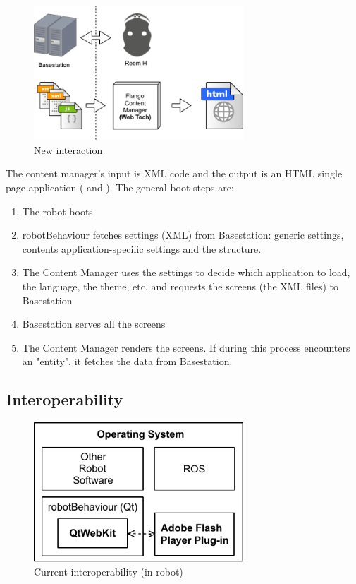 \begin{figure}[htb]
    \centering
    \includegraphics[width=0.7\textwidth]{figures/interaction-new}
    \caption{New interaction}
    \label{fig:interaction-new}
\end{figure}

The content manager's input is \ac{XML} code and the output is an \ac{HTML} single page application ( and ).
The general boot steps are:

\begin{enumerate}
    \item The robot boots
    \item robotBehaviour fetches settings (\ac{XML}) from Basestation: generic settings, contents application-specific settings and the structure.
    \item The Content Manager uses the settings to decide which application to load, the language, the theme, etc. and requests the screens (the \ac{XML} files) to Basestation
    \item Basestation serves all the screens
    \item The Content Manager renders the screens. If during this process encounters an "entity", it fetches the data from Basestation.
\end{enumerate}


\subsection{Interoperability}
\begin{figure}[htb]
    \centering
    \includegraphics[width=0.7\textwidth]{figures/interoperability-original}
    \caption{Current interoperability (in robot)}
    \label{fig:interoperability-original}
\end{figure}

